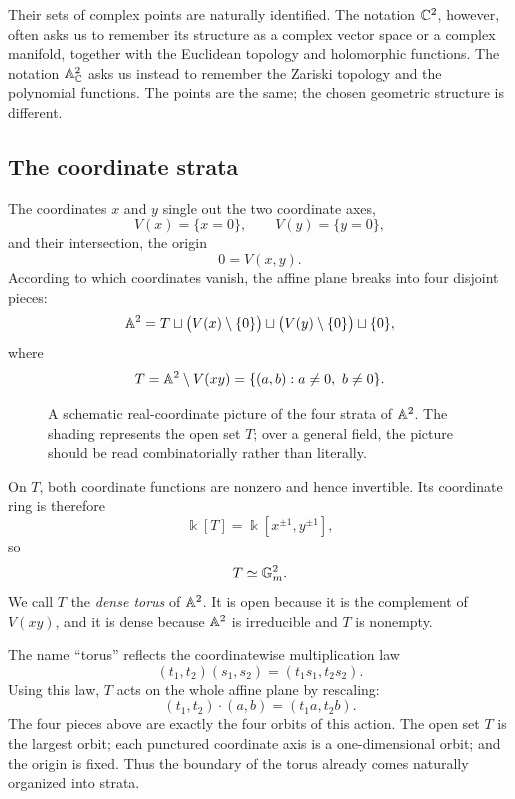 Their sets of complex points are naturally identified. The notation
\(\mathbb{C}^2\), however, often asks us to remember its structure as a
complex vector space or a complex manifold, together with the
Euclidean topology and holomorphic functions. The notation
\(\mathbb{A}^2_{\mathbb{C}}\) asks us instead to remember the Zariski topology and
the polynomial functions. The points are the same; the chosen
geometric structure is different.

\subsection{The coordinate strata}

The coordinates \(x\) and \(y\) single out the two coordinate axes,
\[
V(x)=\{x=0\},
\qquad
V(y)=\{y=0\},
\]
and their intersection, the origin
\[
0=V(x,y).
\]
According to which coordinates vanish, the affine plane breaks into
four disjoint pieces:
\[
\mathbb{A}^2
=
T
\sqcup
\bigl(V(x)\setminus\{0\}\bigr)
\sqcup
\bigl(V(y)\setminus\{0\}\bigr)
\sqcup
\{0\},
\]
where
\[
T
=
\mathbb{A}^2\setminus V(xy)
=
\{(a,b):a\neq0,\ b\neq0\}.
\]

\begin{figure}[ht]
\centering
{}
\caption{A schematic real-coordinate picture of the four strata of
\(\mathbb{A}^2\). The shading represents the open set \(T\); over a general
field, the picture should be read combinatorially rather than
literally.}
\label{fig:a2-strata}
\end{figure}

On \(T\), both coordinate functions are nonzero and hence invertible.
Its coordinate ring is therefore
\[
\Bbbk[T]=\Bbbk[x^{\pm1},y^{\pm1}],
\]
so
\[
T\simeq\mathbb{G}_{m}^2.
\]
We call \(T\) the \emph{dense torus} of \(\mathbb{A}^2\). It is open because
it is the complement of \(V(xy)\), and it is dense because
\(\mathbb{A}^2\) is irreducible and \(T\) is nonempty.

The name ``torus'' reflects the coordinatewise multiplication law
\[
(t_1,t_2)(s_1,s_2)=(t_1s_1,t_2s_2).
\]
Using this law, \(T\) acts on the whole affine plane by rescaling:
\[
(t_1,t_2)\cdot(a,b)=(t_1a,t_2b).
\]
The four pieces above are exactly the four orbits of this action.
The open set \(T\) is the largest orbit; each punctured coordinate
axis is a one-dimensional orbit; and the origin is fixed. Thus the
boundary of the torus already comes naturally organized into strata.

